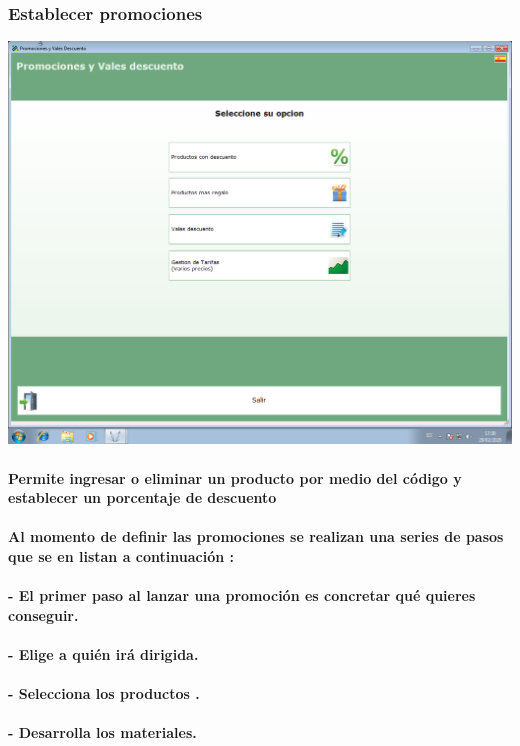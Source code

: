 \documentclass[12pt,a4paper]{article}
\begin{document}
\subsubsection*{Establecer promociones}
\includegraphics[scale=0.35]{Promociones.png} 
\paragraph{Permite ingresar o eliminar un producto por medio del código y establecer un porcentaje de descuento}
\paragraph{ Al momento de definir las promociones se realizan una series de pasos que se en listan a continuación : } 
\paragraph{- El primer paso al lanzar una promoción es concretar qué quieres conseguir.}
\paragraph{- Elige a quién irá dirigida.}
\paragraph{- Selecciona los productos .}
\paragraph{- Desarrolla los materiales. }
\end{document}

